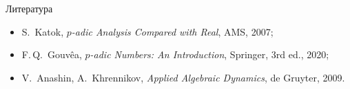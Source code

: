 \documentclass[serif, aspectratio=169]{beamer}
\begin{document}
\begin{frame}{Литература}
    \begin{itemize}[<.->]
        \item S.~Katok, \textit{$p$-adic Analysis Compared with Real}, AMS, 2007;
        \item F.\,Q.~Gouvêa, \textit{$p$-adic Numbers: An Introduction}, Springer, 3rd ed., 2020;
        \item V.~Anashin, A.~Khrennikov, \textit{Applied Algebraic Dynamics}, de Gruyter, 2009.
    \end{itemize}
    \note{
        \begin{itemize}
            \item ---
        \end{itemize}
    }
\end{frame}
\end{document}
